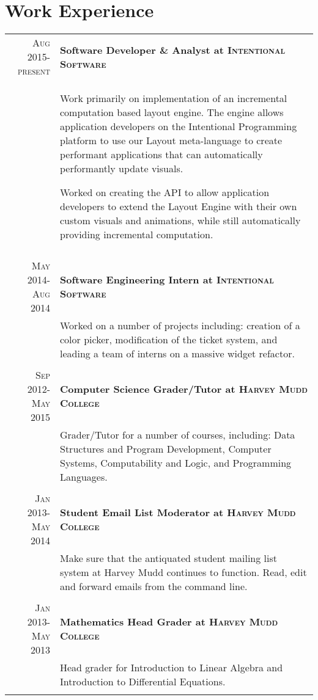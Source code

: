 \documentclass[letterpaper,10pt]{article} %
\newcommand{\work}[3]{ \textsc{#1} & \textbf{#2} \\
& #3\\
\multicolumn{2}{c}{} \\}
\begin{document}
\section{Work Experience}

\begin{tabular}{r|p{14.5cm}} %



\work{Aug 2015-present}{Software Developer \& Analyst at \textsc{Intentional Software}}{
  Work primarily on implementation of an incremental computation based layout engine. The engine allows application developers on the Intentional Programming
  platform to use our Layout meta-language to create performant applications that can automatically performantly update visuals. 

  Worked on creating
  the API to allow application developers to extend the Layout Engine with their own custom visuals and animations, while still automatically providing incremental
  computation.
}


\work{May 2014-Aug 2014}{Software Engineering Intern at \textsc{Intentional Software}}{
	Worked on a number of projects including: creation of a color picker, modification of the ticket system, and
	leading a team of interns on a massive widget refactor.
}


\work{Sep 2012-May 2015}{Computer Science Grader/Tutor at \textsc{Harvey Mudd College}}{
	Grader/Tutor for a number of courses, including: Data Structures and Program Development, Computer Systems, Computability and Logic, and Programming Languages.
}


\work{Jan 2013-May 2014}{Student Email List Moderator at \textsc{Harvey Mudd College}}{
	Make sure that the antiquated student mailing list system at Harvey Mudd continues to function. Read, edit and forward emails from the command line.
}


\work{Jan 2013-May 2013}{Mathematics Head Grader at \textsc{Harvey Mudd College}}{
	Head grader for Introduction to Linear Algebra and Introduction to Differential Equations.
}

\end{tabular}
\vspace{-3mm} %
\end{document}
